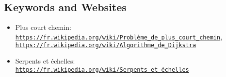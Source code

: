 \documentclass[a4paper,11pt]{report}
\newcommand{\BrochureUrlText}[1]{\texttt{#1}}
\begin{document}
{\raggedright

\subsection*{Keywords and Websites}

\begin{itemize}
  \item Plus court chemin: \href{https://fr.wikipedia.org/wiki/Probl\%C3\%A8me_de_plus_court_chemin}{\BrochureUrlText{https://fr.wikipedia.org/wiki/Problème\_de\_plus\_court\_chemin}}, \href{https://fr.wikipedia.org/wiki/Algorithme_de_Dijkstra}{\BrochureUrlText{https://fr.wikipedia.org/wiki/Algorithme\_de\_Dijkstra}}
  \item Serpents et échelles: \href{https://fr.wikipedia.org/wiki/Serpents_et_\%C3\%A9chelles}{\BrochureUrlText{https://fr.wikipedia.org/wiki/Serpents\_et\_échelles}}
\end{itemize}


}
\end{document}
